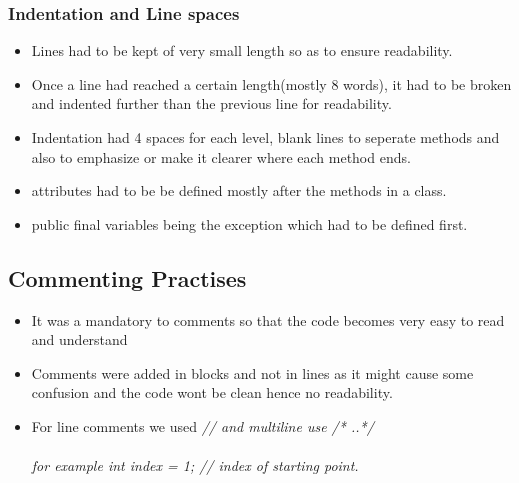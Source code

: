 \documentclass[12pt]{article}
\begin{document}
 	\subsubsection{Indentation and Line spaces}
	\begin{itemize}
		\item Lines had to be kept of very small length so as to ensure readability.
		\item Once a line had reached  a certain length(mostly 8 words), it had to be broken 	and 				indented further than the previous line for readability.
		\item Indentation had  4 spaces for each level, blank lines to seperate methods and also to 				emphasize or make it clearer where each method ends.
		
		\item attributes had to be be defined mostly after the methods in a class.
		\item public final variables being the exception which had to be defined first.
	\end{itemize}
	
 	\subsection{Commenting Practises}
 		\begin{itemize}
		\item It was a mandatory to comments so that the code becomes very easy to read and understand
		\item Comments were added in blocks and not in lines as it might cause some confusion 						and the code wont be clean hence no readability.
		\item For line comments we used {\it // and multiline use /* ..*/}\\\\
		{\it for example int index  = 1; // index of starting point.}\\\\
		
		\end{itemize}
\end{document}
